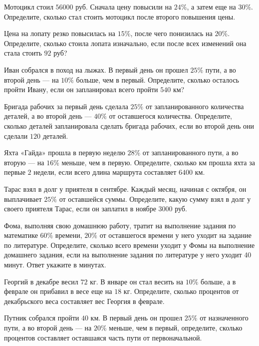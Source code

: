 \begin{class}[number=3]
	\begin{listofex}
		\item Мотоцикл стоил \( 56000 \) руб. Сначала цену повысили на \( 24\% \), а затем еще на \( 30\% \). Определите, сколько стал стоить мотоцикл после второго повышения цены.
		\item Цена на лопату резко повысилась на \( 15\% \), после чего понизилась на \( 20\% \). Определите, сколько стоила лопата изначально, если после всех изменений она стала стоить \( 92 \) руб?
		\item Иван собрался в поход на лыжах. В первый день он прошел \( 25\% \) пути, а во второй день — на \( 10\% \) больше, чем в первый. Определите, сколько осталось пройти Ивану, если он запланировал всего пройти \( 540 \) км?
		\item Бригада рабочих за первый день сделала \( 25\% \) от запланированного количества деталей, а во второй день — \( 40\% \) от оставшегося количества. Определите, сколько деталей запланировала сделать бригада рабочих, если во второй день они сделали \( 120 \) деталей.
		\item Яхта «Гайда» прошла в первую неделю \( 28\% \) от запланированного пути, а во вторую — на \( 16\% \) меньше, чем в первую. Определите, сколько км прошла яхта за первые \( 2 \) недели, если всего длина маршрута составляет \( 6400 \) км.
		\item Тарас взял в долг у приятеля в сентябре. Каждый месяц, начиная с октября, он выплачивает \( 25\% \) от оставшейся суммы. Определите, какую сумму взял в долг у своего приятеля Тарас, если он заплатил в ноябре \( 3000 \) руб.
		\item Фома, выполняя свою домашнюю работу, тратит на выполнение задания по математике \( 60\% \) времени, \( 20\% \) от оставшегося времени у него уходит на задание по литературе. Определите, сколько всего времени уходит у Фомы на выполнение домашнего задания, если на выполнение задания по литературе у него уходит 40 минут. Ответ укажите в минутах.
		\item Георгий в декабре весил \( 72 \) кг. В январе он стал весить на \( 10\% \) больше, а в феврале он прибавил в весе еще на \( 18 \) кг. Определите, сколько процентов от декабрьского веса составляет вес Георгия в феврале.
		\item Путник собрался пройти \( 40  \) км. В первый день он прошел \( 25\% \) от назначенного пути, а во второй день — на \( 20\% \) меньше, чем в первый, определите, сколько процентов составляет оставшаяся часть пути от первоначальной.
		
	\end{listofex}
\end{class}

